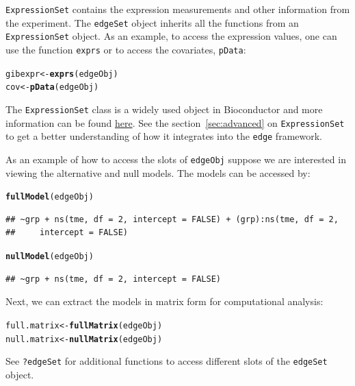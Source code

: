 \documentclass{article}\usepackage[]{graphicx}\usepackage[]{color}
\makeatletter
\newcommand{\hlstd}[1]{\textcolor[rgb]{0.345,0.345,0.345}{#1}}%
\newcommand{\hlkwb}[1]{\textcolor[rgb]{0.69,0.353,0.396}{#1}}%
\newcommand{\hlkwd}[1]{\textcolor[rgb]{0.737,0.353,0.396}{\textbf{#1}}}%
\newenvironment{kframe}{%
 \def\at@end@of@kframe{}%
 \ifinner\ifhmode%
  \def\at@end@of@kframe{\end{minipage}}%
  \begin{minipage}{\columnwidth}%
 \fi\fi%
 \def\FrameCommand##1{\hskip\@totalleftmargin \hskip-\fboxsep
 \colorbox{shadecolor}{##1}\hskip-\fboxsep
     \hskip-\linewidth \hskip-\@totalleftmargin \hskip\columnwidth}%
 \MakeFramed {\advance\hsize-\width
   \@totalleftmargin\z@ \linewidth\hsize
   \@setminipage}}%
 {\par\unskip\endMakeFramed%
 \at@end@of@kframe}
\newenvironment{knitrout}{}{} %
\makeatother
\begin{document}
{\tt ExpressionSet} contains the expression measurements and other information from the experiment. The {\tt edgeSet} object inherits all the functions from an {\tt ExpressionSet} object. As an example, to access the expression values, one can use the function {\tt exprs} or to access the covariates, {\tt pData}:
\begin{knitrout}
\color{fgcolor}\begin{kframe}
\begin{alltt}
\hlstd{gibexpr} \hlkwb{<-} \hlkwd{exprs}\hlstd{(edgeObj)}
\hlstd{cov} \hlkwb{<-} \hlkwd{pData}\hlstd{(edgeObj)}
\end{alltt}
\end{kframe}
\end{knitrout}
The {\tt ExpressionSet} class is a widely used object in Bioconductor and more information can be found \href{http://www.bioconductor.org/packages/2.14/bioc/html/Biobase.html}{here}. See the section~\ref{sec:advanced} on {\tt ExpressionSet} to get a better understanding of how it integrates into the {\tt edge} framework.

As an example of how to access the slots of {\tt edgeObj} suppose we are interested in viewing the alternative and null models. The models can be accessed by:
\begin{knitrout}
\color{fgcolor}\begin{kframe}
\begin{alltt}
\hlkwd{fullModel}\hlstd{(edgeObj)}
\end{alltt}
\begin{verbatim}
## ~grp + ns(tme, df = 2, intercept = FALSE) + (grp):ns(tme, df = 2, 
##     intercept = FALSE)
\end{verbatim}
\begin{alltt}
\hlkwd{nullModel}\hlstd{(edgeObj)}
\end{alltt}
\begin{verbatim}
## ~grp + ns(tme, df = 2, intercept = FALSE)
\end{verbatim}
\end{kframe}
\end{knitrout}
Next, we can extract the models in matrix form for computational analysis:
\begin{knitrout}
\color{fgcolor}\begin{kframe}
\begin{alltt}
\hlstd{full.matrix} \hlkwb{<-} \hlkwd{fullMatrix}\hlstd{(edgeObj)}
\hlstd{null.matrix} \hlkwb{<-} \hlkwd{nullMatrix}\hlstd{(edgeObj)}
\end{alltt}
\end{kframe}
\end{knitrout}
See {\tt ?edgeSet} for additional functions to access different slots of the {\tt edgeSet} object. 
\end{document}
